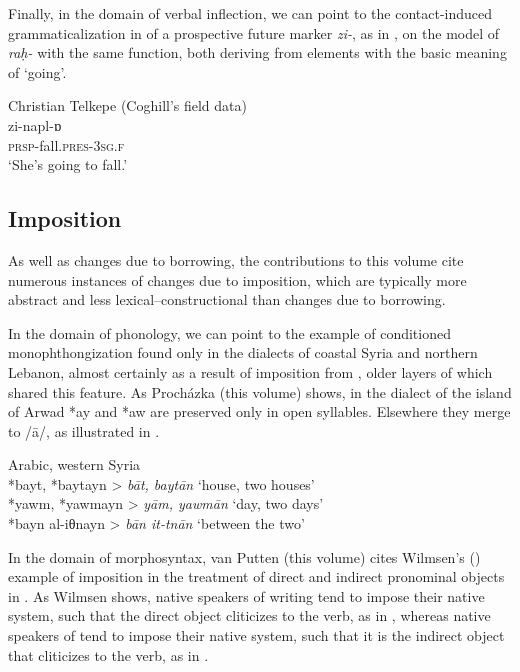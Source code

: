 \documentclass[output=paper]{langsci/langscibook}
\begin{document}
Finally, in the domain of verbal {inflection}, we can point to the {contact-induced grammaticalization} in  of a prospective {future} marker \textit{zi-}, as in , on the model of  \textit{raḥ-} with the same function, both deriving from elements with the basic meaning of `going'.

\ea\label{introgoing}Christian Telkepe  (Coghill’s field data)\\
\gll zi-napl-ɒ\\
     \textsc{prsp-}fall.\textsc{pres}{}-\textsc{3sg.f}\\
\glt ‘She’s going to fall.’
\z

\subsection{Imposition}


As well as changes due to borrowing, the contributions to this volume cite numerous instances of changes due to {imposition}, which are typically more abstract and less lexical--constructional than changes due to borrowing.


In the domain of phonology, we can point to the example of conditioned monophthongization found only in the  dialects of coastal Syria and northern Lebanon, almost certainly as a result of {imposition} from , older layers of which shared this feature. As Procházka (this volume)  shows, in the dialect of the island of Arwad *ay and *aw are preserved only in open syllables. Elsewhere they {merge} to /ā/, as illustrated in .


\ea\label{intromonophth}
{ Arabic, western Syria \citep[278]{Procházka2013}} \\
    *bayt, *baytayn > \textit{bāt, baytān} ‘house, two houses’\\
*yawm, *yawmayn >  \textit{yām, yawmān} ‘day, two days’\\
*bayn al-iθnayn > \textit{bān it-tnān} ‘between the two’\\
\z

In the domain of morphosyntax, van Putten (this volume) cites Wilmsen's (\citeyear{Wilmsen2010}) example of {imposition} in the treatment of direct and indirect pronominal objects in . As Wilmsen shows, native speakers of  writing  tend to impose their native system, such that the direct object cliticizes to the verb, as in , whereas native speakers of   tend to impose their native system, such that it is the indirect object that cliticizes to the verb, as in .
\end{document}
